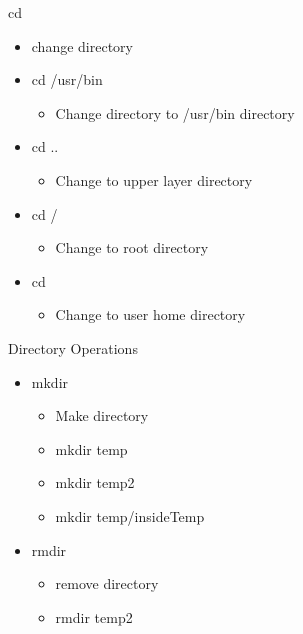 \documentclass{beamer}
\begin{document}
\begin{frame}{cd}
\begin{itemize}
\item change directory
\item cd /usr/bin
\begin{itemize}
\item Change directory to /usr/bin directory
\end{itemize}
\item cd ..
\begin{itemize}
\item Change to upper layer directory
\end{itemize}
\item cd /
\begin{itemize}
\item Change to root directory
\end{itemize}
\item cd ~
\begin{itemize}
\item Change to user home directory
\end{itemize}
\end{itemize}
\end{frame}

\begin{frame}{Directory Operations}
\begin{itemize}
\item mkdir
\begin{itemize}
\item Make directory
\item mkdir temp
\item mkdir temp2
\item mkdir temp/insideTemp
\end{itemize}
\item rmdir
\begin{itemize}
\item remove directory
\item rmdir temp2
\end{itemize}
\end{itemize}
\end{frame}
\end{document}
